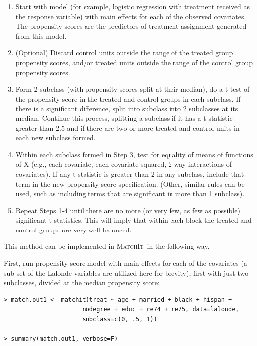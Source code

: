 \documentclass[oneside,letterpaper,titlepage]{article}
\newcommand{\MatchIt}{\textsc{MatchIt}}
\begin{document}
\begin{enumerate}
\item Start with model (for example, logistic regression with
  treatment received as the response variable) with main effects for
  each of the observed covariates.  The propensity scores are the
  predictors of treatment assignment generated from this model.
\item (Optional) Discard control units outside the range of the
  treated group propensity scores, and/or treated units outside the
  range of the control group propensity scores.
\item Form 2 subclass (with propensity scores split at their median),
  do a t-test of the propensity score in the treated and control
  groups in each subclass.  If there is a significant difference,
  split into subclass into 2 subclasses at its median.  Continue this
  process, splitting a subclass if it has a t-statistic greater than
  2.5 and if there are two or more treated and control units in each
  new subclass formed.
\item Within each subclass formed in Step 3, test for equality of
  means of functions of X (e.g., each covariate, each covariate
  squared, 2-way interactions of covariates).  If any t-statistic is
  greater than 2 in any subclass, include that term in the new
  propensity score specification.  (Other, similar rules can be used,
  such as including terms that are significant in more than 1
  subclass).
\item Repeat Steps 1-4 until there are no more (or very few, as few as
  possible) significant t-statistics.  This will imply that within
  each block the treated and control groups are very well balanced.
\end{enumerate}

This method can be implemented in \MatchIt\ in the following way.

First, run propensity score model with main effects for each of the
covariates (a sub-set of the Lalonde variables are utilized here for
brevity), first with just two subclasses, divided at the median
propensity score:

\begin{verbatim}
> match.out1 <- matchit(treat ~ age + married + black + hispan +
                      nodegree + educ + re74 + re75, data=lalonde,                      
                      subclass=c(0, .5, 1))

> summary(match.out1, verbose=F)
\end{verbatim}
\end{document}
